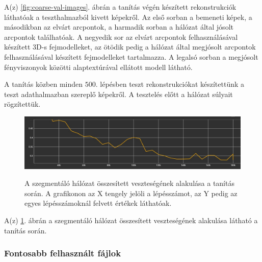 \documentclass[12pt,a4]{article}
\begin{document}
        A(z) \ref{fig:coarse-val-images}. ábrán a tanítás végén készített rekonstrukciók láthatóak a teszthalmazból kivett képekről. Az első sorban a bemeneti képek, a másodikban az elvárt arcpontok, a harmadik sorban a hálózat által jósolt arcpontok találhatóak. A negyedik sor az elvárt arcpontok felhasználásával készített 3D-s fejmodelleket, az ötödik pedig a hálózat által megjósolt arcpontok felhasználásával készített fejmodelleket tartalmazza. A legalsó sorban a megjósolt fényviszonyok közötti alaptextúrával ellátott modell látható.

        A tanítás közben minden $500$. lépésben teszt rekonstrukciókat készítettünk a teszt adathalmazban szereplő képekről. A tesztelés előtt a hálózat súlyait rögzítettük.
        
          \begin{figure}[h!]
            \centering
            \includegraphics[width=1\linewidth]{coarse-unet-all-loss.jpg}
            \label{fig:coarse-unet-all-loss} 
            \caption{A szegmentáló hálózat összesített veszteségének alakulása a tanítás során. A grafikonon az X tengely jelöli a lépésszámot, az Y pedig az egyes lépésszámoknál felvett értékek láthatóak.}
            \label{fig:coarse-unet-loss-results}
        \end{figure}

        A(z) \ref{fig:coarse-unet-loss-results}. ábrán a szegmentáló hálózat összesített veszteségének alakulása látható a tanítás során.
        
                
        
        
    \subsubsection{Fontosabb felhasznált fájlok}
\end{document}
